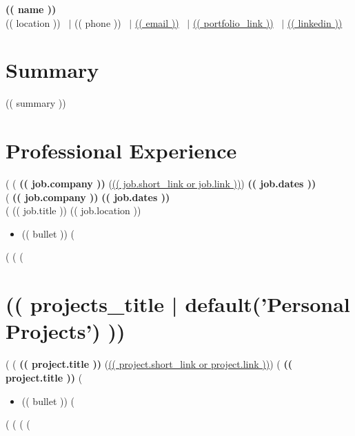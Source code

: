 \documentclass[9pt]{article}
\begin{document}
\begin{center}
    {\Huge \textbf{(( name ))}} \\
    \vspace{0.5em}
    (( location )) \ $|$ (( phone )) \ $|$ \href{mailto:(( email ))}{(( email ))} \ $|$ 
    \href{https://(( portfolio_link ))}{(( portfolio_link ))} \  $|$
    \href{https://(( linkedin ))}{(( linkedin ))} \
\end{center}

\section*{Summary}
(( summary ))

\section*{Professional Experience}
(%
(%
\noindent\textbf{(( job.company ))} (\href{(( job.link ))}{(( job.short_link or job.link ))}) \hfill \textbf{(( job.dates ))} \\
(%
\noindent\textbf{(( job.company ))} \hfill \textbf{(( job.dates ))} \\
(%
(( job.title )) \hfill (( job.location ))
\begin{itemize}
(%
    \item (( bullet ))
(%
\end{itemize}
(%
\vspace{0.5em}
(%
(%
\section*{(( projects_title | default('Personal Projects') ))}
(%
(%
\noindent\textbf{(( project.title ))} (\href{(( project.link ))}{(( project.short_link or project.link ))})
(%
\noindent\textbf{(( project.title ))}
(%
\begin{itemize}
(%
    \item (( bullet ))
(%
\end{itemize}
(%
\vspace{0.25em}
(%
(%
(%
\end{document}
